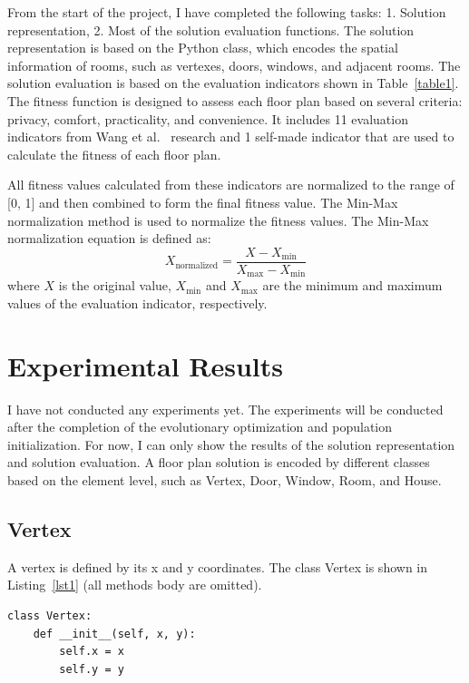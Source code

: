 \documentclass[]{article}
\begin{document}
From the start of the project, I have completed the following tasks: 1. Solution representation, 2. Most of the solution evaluation functions. The solution representation is based on the Python class, which encodes the spatial information of rooms, such as vertexes, doors, windows, and adjacent rooms.
The solution evaluation is based on the evaluation indicators shown in Table~\ref{table1}. The fitness function is designed to assess each floor plan based on several criteria: privacy, comfort, practicality, and convenience. It includes 11 evaluation indicators from Wang et al.~\cite{WANG2023100238} research and 1 self-made indicator that are used to calculate the fitness of each floor plan.

All fitness values calculated from these indicators are normalized to the range of [0, 1] and then combined to form the final fitness value. The Min-Max normalization method is used to normalize the fitness values. The Min-Max normalization equation is defined as:
\begin{equation*}
X_{\text{normalized}} = \frac{X - X_{\text{min}}}{X_{\text{max}} - X_{\text{min}}}
\end{equation*}
where $X$ is the original value, $X_{\text{min}}$ and $X_{\text{max}}$ are the minimum and maximum values of the evaluation indicator, respectively.

\section{Experimental Results}
I have not conducted any experiments yet. The experiments will be conducted after the completion of the evolutionary optimization and population initialization. For now, I can only show the results of the solution representation and solution evaluation. A floor plan solution is encoded by different classes based on the element level, such as Vertex, Door, Window, Room, and House. 
\subsection{Vertex}
A vertex is defined by its x and y coordinates. The class Vertex is shown in Listing~\ref{lst1} (all methods body are omitted).
\begin{lstlisting}[caption=Vertex class, label=lst1]
class Vertex:
    def __init__(self, x, y):
        self.x = x
        self.y = y
\end{lstlisting}
\end{document}
